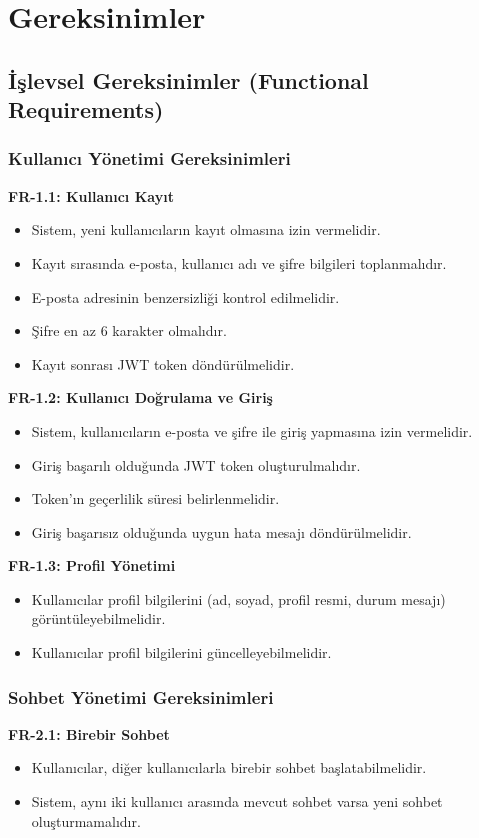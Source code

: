 \chapter{Gereksinimler}

\section{İşlevsel Gereksinimler (Functional Requirements)}

\subsection{Kullanıcı Yönetimi Gereksinimleri}
\textbf{FR-1.1: Kullanıcı Kayıt}
\begin{itemize}
    \item Sistem, yeni kullanıcıların kayıt olmasına izin vermelidir.
    \item Kayıt sırasında e-posta, kullanıcı adı ve şifre bilgileri toplanmalıdır.
    \item E-posta adresinin benzersizliği kontrol edilmelidir.
    \item Şifre en az 6 karakter olmalıdır.
    \item Kayıt sonrası JWT token döndürülmelidir.
\end{itemize}

\textbf{FR-1.2: Kullanıcı Doğrulama ve Giriş}
\begin{itemize}
    \item Sistem, kullanıcıların e-posta ve şifre ile giriş yapmasına izin vermelidir.
    \item Giriş başarılı olduğunda JWT token oluşturulmalıdır.
    \item Token'ın geçerlilik süresi belirlenmelidir.
    \item Giriş başarısız olduğunda uygun hata mesajı döndürülmelidir.
\end{itemize}

\textbf{FR-1.3: Profil Yönetimi}
\begin{itemize}
    \item Kullanıcılar profil bilgilerini (ad, soyad, profil resmi, durum mesajı) görüntüleyebilmelidir.
    \item Kullanıcılar profil bilgilerini güncelleyebilmelidir.
\end{itemize}

\subsection{Sohbet Yönetimi Gereksinimleri}
\textbf{FR-2.1: Birebir Sohbet}
\begin{itemize}
    \item Kullanıcılar, diğer kullanıcılarla birebir sohbet başlatabilmelidir.
    \item Sistem, aynı iki kullanıcı arasında mevcut sohbet varsa yeni sohbet oluşturmamalıdır.
\end{itemize}

